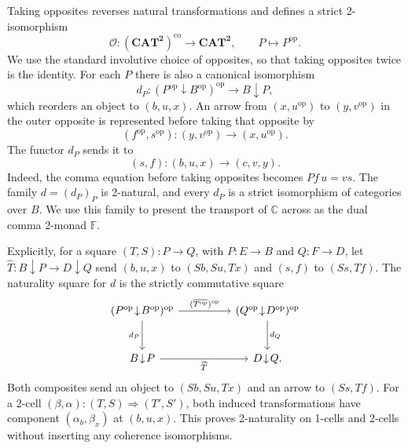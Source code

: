 \documentclass[11pt]{article}
\theoremstyle{plain}
\theoremstyle{definition}
\theoremstyle{remark}
\newcommand{\CAT}{\mathbf{CAT}}
\newcommand{\C}{\mathbb{C}}
\numberwithin{equation}{section}
\begin{document}
Taking opposites reverses natural transformations and defines a strict
2-isomorphism
\begin{equation}
  \mathcal O\colon(\CAT^{\mathbf 2})^{\mathrm{co}}
  \longrightarrow\CAT^{\mathbf 2},
  \qquad P\longmapsto P^{\mathrm{op}}.
  \label{eq:opposite-2-isomorphism}
\end{equation}
We use the standard involutive choice of opposites, so that taking
opposites twice is the identity.  For each $P$ there is also
a canonical isomorphism
\begin{equation}
  d_P\colon
  (P^{\mathrm{op}}\!\downarrow\!B^{\mathrm{op}})^{\mathrm{op}}
  \longrightarrow B\!\downarrow\!P,
  \label{eq:dual-comma-identification}
\end{equation}
which reorders an object to $(b,u,x)$.  An arrow from
$(x,u^{\mathrm{op}})$ to $(y,v^{\mathrm{op}})$ in the outer opposite
is represented before taking that opposite by
\begin{equation*}
  (f^{\mathrm{op}},s^{\mathrm{op}})
  \colon(y,v^{\mathrm{op}})\longrightarrow(x,u^{\mathrm{op}}).
\end{equation*}
The functor $d_P$ sends it to
\begin{equation*}
  (s,f)\colon(b,u,x)\longrightarrow(c,v,y).
\end{equation*}
Indeed, the comma equation before taking opposites becomes $Pf\,u=vs$.
The family $d=(d_P)_P$ is 2-natural, and every
$d_P$ is a strict isomorphism of categories over $B$.  We use this
family to present the transport of $\C$ across
 as the dual comma 2-monad
$\mathbb F$.

Explicitly, for a square $(T,S)\colon P\to Q$, with $P\colon E\to B$
and $Q\colon F\to D$, let
$\widehat T\colon B\!\downarrow\!P\to D\!\downarrow\!Q$ send
$(b,u,x)$ to $(Sb,Su,Tx)$ and $(s,f)$ to $(Ss,Tf)$.  The naturality
square for $d$ is the strictly commutative square
\begin{equation}
\begin{tikzcd}[column sep=huge,row sep=large]
(P^{\mathrm{op}}\!\downarrow\!B^{\mathrm{op}})^{\mathrm{op}}
  \arrow[r,"{(\overline{T^{\mathrm{op}}})^{\mathrm{op}}}"]
  \arrow[d,"d_P"']
& (Q^{\mathrm{op}}\!\downarrow\!D^{\mathrm{op}})^{\mathrm{op}}
  \arrow[d,"d_Q"] \\
B\!\downarrow\!P
  \arrow[r,"{\widehat T}"']
& D\!\downarrow\!Q .
\end{tikzcd}
\label{eq:dual-comma-naturality}
\end{equation}
Both composites send an object to $(Sb,Su,Tx)$ and an arrow to
$(Ss,Tf)$.  For a 2-cell
$(\beta,\alpha)\colon(T,S)\Rightarrow(T',S')$, both induced
transformations have component $(\alpha_b,\beta_x)$ at $(b,u,x)$.
This proves 2-naturality on 1-cells and 2-cells without inserting any
coherence isomorphisms.
\end{document}
